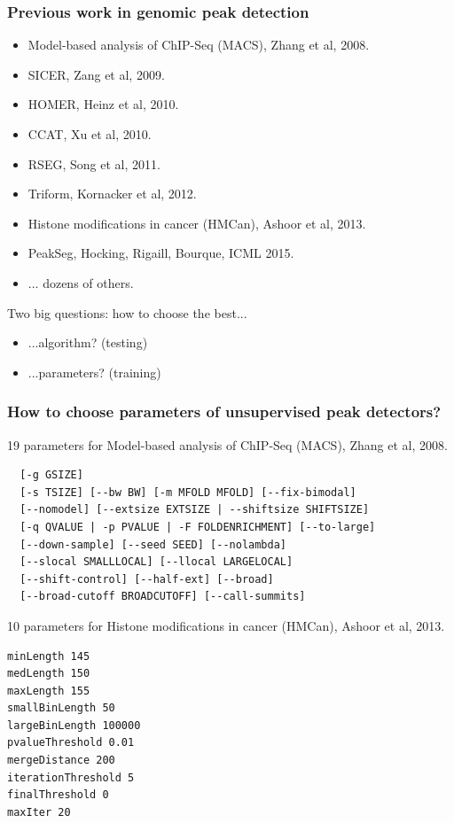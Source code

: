 \documentclass[t]{beamer}
\begin{document}
\begin{frame}
  \frametitle{Previous work in genomic peak detection}
  \begin{itemize}
  \item Model-based analysis of ChIP-Seq (MACS), Zhang et al, 2008.
  \item SICER, Zang et al, 2009.
  \item HOMER, Heinz et al, 2010.
  \item CCAT, Xu et al, 2010.
  \item RSEG, Song et al, 2011.
  \item Triform, Kornacker et al, 2012.
  \item Histone modifications in cancer (HMCan), Ashoor et al, 2013.
  \item PeakSeg, Hocking, Rigaill, Bourque, ICML 2015.
  \item ... dozens of others.
  \end{itemize}
  Two big questions: how to choose the best...
  \begin{itemize}
  \item ...algorithm? (testing)
  \item \alert<1>{...parameters? (training)}
  \end{itemize}
\end{frame}

\begin{frame}[fragile]
  \frametitle{How to choose parameters of unsupervised peak
    detectors?}
\scriptsize
19 parameters for Model-based analysis of ChIP-Seq (MACS), Zhang et al, 2008.
\begin{verbatim}
  [-g GSIZE]
  [-s TSIZE] [--bw BW] [-m MFOLD MFOLD] [--fix-bimodal]
  [--nomodel] [--extsize EXTSIZE | --shiftsize SHIFTSIZE]
  [-q QVALUE | -p PVALUE | -F FOLDENRICHMENT] [--to-large]
  [--down-sample] [--seed SEED] [--nolambda]
  [--slocal SMALLLOCAL] [--llocal LARGELOCAL]
  [--shift-control] [--half-ext] [--broad]
  [--broad-cutoff BROADCUTOFF] [--call-summits]
\end{verbatim}
10 parameters for Histone modifications in cancer (HMCan),
Ashoor et al, 2013.
\begin{verbatim}
minLength 145
medLength 150
maxLength 155
smallBinLength 50
largeBinLength 100000
pvalueThreshold 0.01
mergeDistance 200
iterationThreshold 5
finalThreshold 0
maxIter 20
\end{verbatim}
\end{frame}
 
\end{document}
